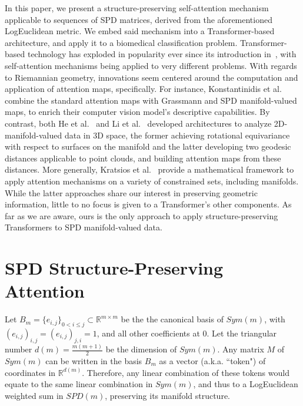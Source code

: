 \documentclass{article}
\begin{document}
In this paper, we present a structure-preserving self-attention mechanism applicable to sequences of SPD matrices, derived from the aforementioned LogEuclidean metric. We embed said mechanism into a Transformer-based architecture, and apply it to a biomedical classification problem.
Transformer-based technology has exploded in popularity ever since its introduction in~\cite{transformers}, with self-attention mechanisms being applied to very different problems.
With regards to Riemannian geometry, innovations seem centered around the computation and application of attention maps, specifically. For instance, Konstantinidis et al.~\cite{Konstantinidis2022MultimanifoldAF} combine the standard attention maps with Grassmann and SPD manifold-valued maps, to enrich their computer vision model's descriptive capabilities. By contrast, both He et al.~\cite{he_gauge_equivariant} and Li et al.~\cite{li2022geodesic} developed architectures to analyze 2D-manifold-valued data in 3D space, the former achieving rotational equivariance with respect to surfaces on the manifold and the latter developing two geodesic distances applicable to point clouds, and building attention maps from these distances. More generally, Kratsios et al.~\cite{kratsios2022universal} provide a mathematical framework to apply attention mechanisms on a variety of constrained sets, including manifolds.
While the latter approaches share our interest in preserving geometric information, little to no focus is given to a Transformer's other components. As far as we are aware, ours is the only approach to apply structure-preserving Transformers to SPD manifold-valued data.


\section{SPD Structure-Preserving Attention}
\label{sec:theory}

Let $B_{m} = \{e_{i, j}\}_{0 < i \leq j} \subset \mathbb{R}^{m \times m}$ be the the canonical basis of $Sym(m)$, with $(e_{i, j})_{i, j} = (e_{i, j})_{j, i} = 1$, and all other coefficients at 0. Let the triangular number $d(m) = \frac{m(m+1)}{2}$ be the dimension of $Sym(m)$.
Any matrix $M$ of $Sym(m)$ can be written in the basis $B_{m}$ as a vector (a.k.a. ``token") of coordinates in $\mathbb{R}^{d(m)}$. Therefore, any linear combination of these tokens would equate to the same linear combination in $Sym(m)$, and thus to a LogEuclidean weighted sum in $SPD(m)$, preserving its manifold structure.
\end{document}
